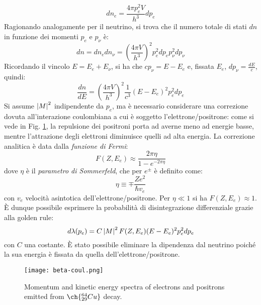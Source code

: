 \begin{equation}
	dn_e = \frac{4\pi p_e^2 V}{h^3} dp_e
	\label{eq:2.26}
\end{equation}
Ragionando analogamente per il neutrino, si trova che il numero totale di stati $ dn $ in funzione dei momenti $ p_e $ e $ p_{\nu} $ è:
\begin{equation}
	dn = dn_e dn_{\nu} = \left( \frac{4\pi V}{h^3} \right)^2 p_e^2 dp_e p_{\nu}^2 dp_{\nu}
	\label{eq:2.27}
\end{equation}
Ricordando il vincolo $ E = E_e + E_{\nu} $, si ha che $ cp_{\nu} = E - E_e $ e, fissata $ E_e $, $ dp_{\nu} = \frac{dE}{c} $, quindi:
\begin{equation}
	\frac{dn}{dE} = \left( \frac{4\pi V}{h^3} \right)^2 \frac{1}{c^3} (E - E_e)^2 p_e^2 dp_e
	\label{eq:2.28}
\end{equation}
Si assume $ \left\lvert M\right\rvert^2 $ indipendente da $ p_e $, ma è necessario considerare una correzione dovuta all'interazione coulombiana a cui è soggetto l'elettrone/positrone: come si vede in Fig. \ref{beta-coul}, la repulsione dei positroni porta ad averne meno ad energie basse, mentre l'attrazione degli elettroni diminuisce quelli ad alta energia. La correzione analitica è data dalla \textit{funzione di Fermi}:
\begin{equation}
	F(Z,E_e) \approx \frac{2\pi \eta}{1 - e^{-2\pi \eta}}
	\label{eq:2.29}
\end{equation}
dove $ \eta $ è il \textit{parametro di Sommerfeld}, che per $ e^{\pm} $ è definito come:
\begin{equation}
	\eta \equiv \mp \frac{Ze^2}{\hbar v_e}
	\label{eq:2.30}
\end{equation}
con $ v_e $ velocità asintotica dell'elettrone/positrone. Per $ \eta \ll 1 $ si ha $ F(Z,E_e) \approx 1 $.\\
È dunque possibile esprimere la probabilità di disintegrazione differenziale grazie alla golden rule:
\begin{equation}
	d\lambda(p_e) = C \left\lvert M\right\rvert^2 F(Z,E_e) (E - E_e)^2 p_e^2 dp_e
	\label{eq:2.31}
\end{equation}
con $ C $ una costante. È stato possibile eliminare la dipendenza dal neutrino poiché la sua energia è fissata da quella dell'elettrone/positrone.

\begin{figure}[b!]
	\centering
	\texttt{[image: beta-coul.png]}
	\caption{Momentum and kinetic energy spectra of electrons and positrons emitted from $ \ch{^{64}_{29}Cu} $ decay.}
	\label{beta-coul}
\end{figure}

